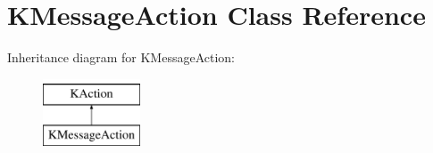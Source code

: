 \hypertarget{class_k_message_action}{\section{\-K\-Message\-Action \-Class \-Reference}
\label{class_k_message_action}
}
\-Inheritance diagram for \-K\-Message\-Action\-:\begin{figure}[H]
\begin{center}
\leavevmode
\includegraphics[height=2.000000cm]{class_k_message_action}
\end{center}
\end{figure}
